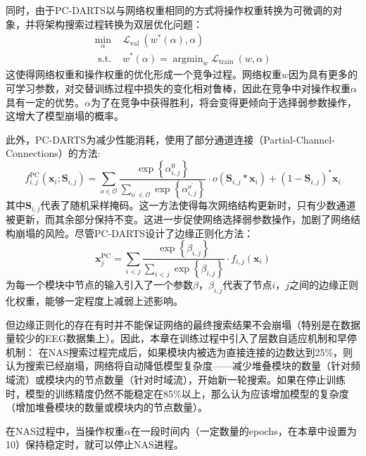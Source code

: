 同时，由于PC-DARTS以与网络权重相同的方式将操作权重转换为可微调的对象，并将架构搜索过程转换为双层优化问题：
\begin{equation}
\label{deqn_ex32}
\begin{array}{cl}\min _\alpha & \mathcal{L}_{\text {val }}\left(w^*(\alpha), \alpha\right) \\ 
\text { s.t. } & w^*(\alpha)=\operatorname{argmin}_w \mathcal{L}_{\text {train }}(w, \alpha)\end{array}
\end{equation}
这使得网络权重和操作权重的优化形成一个竞争过程。网络权重$w$因为具有更多的可学习参数，对交替训练过程中损失的变化相对鲁棒，因此在竞争中对操作权重$\alpha$具有一定的优势。$\alpha$为了在竞争中获得胜利，将会变得更倾向于选择弱参数操作，这增大了模型崩塌的概率。

此外，PC-DARTS为减少性能消耗，使用了部分通道连接（Partial-Channel-Connections）的方法:
\begin{equation}
    \label{deqn_ex33}
f_{i, j}^{\mathrm{PC}}\left(\mathbf{x}_i ; \mathbf{S}_{i, j}\right)= \sum_{o \in \mathcal{O}} \frac{\exp \left\{\alpha_{i, j}^0\right\}}{\sum_{o^{\prime} \in \mathcal{O}} \exp \left\{\alpha_{i, j}^{o^{\prime}}\right\}} \cdot o\left(\mathbf{S}_{i, j} * \mathbf{x}_i\right)+\left(1-\mathbf{S}_{i, j}\right)^* \mathbf{x}_i
\end{equation}
其中$\mathbf{S}_{i, j}$代表了随机采样掩码。这一方法使得每次网络结构更新时，只有少数通道被更新，而其余部分保持不变。这进一步促使网络选择弱参数操作，加剧了网络结构崩塌的风险。尽管PC-DARTS设计了边缘正则化方法：
\begin{equation}
    \label{deqn_ex34}
\mathbf{x}_j^{\mathrm{PC}}=\sum_{i<j} \frac{\exp \left\{\beta_{i, j}\right\}}{\sum_{i<j} \exp \left\{\beta_{i, j}\right\}} \cdot f_{i, j}\left(\mathbf{x}_i\right)
\end{equation}
为每一个模块中节点的输入引入了一个参数$\beta$，$\beta_{i, j}$代表了节点$i$，$j$之间的边缘正则化权重，能够一定程度上减弱上述影响。

但边缘正则化的存在有时并不能保证网络的最终搜索结果不会崩塌（特别是在数据量较少的EEG数据集上）。因此，本章在训练过程中引入了层数自适应机制和早停机制：
在NAS搜索过程完成后，如果模块内被选为直接连接的边数达到25\%，则认为搜索已经崩塌，网络将自动降低模型复杂度——减少堆叠模块的数量（针对频域流）或模块内的节点数量（针对时域流），开始新一轮搜索。如果在停止训练时，模型的训练精度仍然不能稳定在85\%以上，那么认为应该增加模型的复杂度（增加堆叠模块的数量或模块内的节点数量）。

在NAS过程中，当操作权重$\alpha$在一段时间内（一定数量的epochs，在本章中设置为10）保持稳定时，就可以停止NAS进程。


